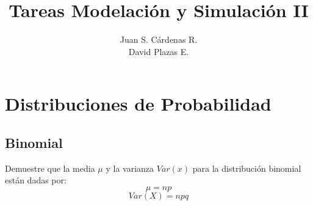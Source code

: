 \documentclass[12pt]{article}
\begin{document}
	\title{Tareas Modelación y Simulación II}
    \author{Juan S. Cárdenas R.\\ David Plazas E.}
    \maketitle
    \section{Distribuciones de Probabilidad}
    	\subsection{Binomial}
            Demuestre que la media $\mu$ y la varianza $Var (x)$ para la distribución binomial están dadas por:
            \begin{equation}
                \mu = np
            \end{equation}
            \begin{equation}
                Var(X) = npq
            \end{equation}
\end{document}
